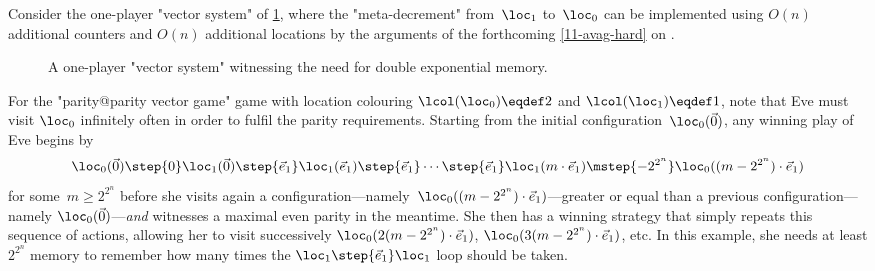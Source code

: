 
\begin{example}
  Consider the one-player "vector system" of \cref{11-fig-finitemem},
  where the "meta-decrement" from~$\loc_1$ to~$\loc_0$ can be
  implemented using $O(n)$ additional counters and $O(n)$ additional
  locations by the arguments of the forthcoming \cref{11-avag-hard}
  on .
  
  \begin{figure}[htbp]
    \centering
  \caption{\label{11-fig-finitemem} A one-player "vector system"
  witnessing the need for double exponential memory.}
  \end{figure}

  For the "parity@parity vector game" game with location colouring
  $\lcol(\loc_0)\eqdef 2$ and $\lcol(\loc_1)\eqdef 1$, note that Eve
  must visit $\loc_0$ infinitely often in order to fulfil the parity
  requirements.  Starting from the initial
  configuration~$\loc_0(\vec 0)$, any winning play of Eve begins
  by \begin{equation*} \loc_0(\vec 0)\step{0}\loc_1(\vec 0)\step{\vec
      e_1}\loc_1(\vec e_1)\step{\vec e_1}\cdots\step{\vec
      e_1}\loc_1(m\cdot\vec
    e_1)\mstep{-2^{2^n}}\loc_0((m-2^{2^n})\cdot\vec
    e_1) \end{equation*} for some~$m\geq 2^{2^n}$ before she visits
  again a
  configuration---namely~$\loc_0((m-2^{2^n})\cdot\vec e_1)$---greater
  or equal than a previous configuration---namely
  $\loc_0(\vec 0)$---\emph{and} witnesses a maximal even parity in the
  meantime.  She then has a winning strategy that simply repeats this
  sequence of actions, allowing her to visit successively
  $\loc_0(2(m-2^{2^n})\cdot\vec e_1)$,
  $\loc_0(3(m-2^{2^n})\cdot\vec e_1)$, etc.  In this example, she
  needs at least $2^{2^n}$ memory to remember how many times the
  $\loc_1\step{\vec e_1}\loc_1$ loop should be taken.
\end{example}

